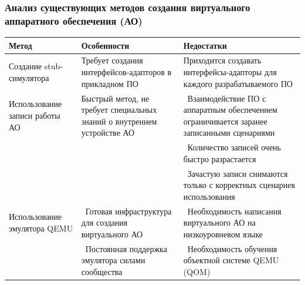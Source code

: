 \begin{frame}%
    \frametitle{Анализ существующих методов создания виртуального аппаратного обеспечения (АО)}
    \newcommand{\tabitem}{{\textbullet}~}
        {\fontsize{8pt}{9.5pt}\selectfont
            \begin{longtable}{| p{3cm} | p{3cm} | p{4cm} |}
                \hline
                Метод & Особенности & Недостатки \\
                \hline
                    Создание stub-симулятора &
                    Требует создания интерфейсов-адапторов в прикладном ПО &
                    Приходится создавать интерфейсы-адапторы для каждого разрабатываемого ПО \\
                \hline
                    Использование записи работы АО &
                    Быстрый метод, не требует специальных знаний о внутреннем устройстве АО &
                    \tabitem Взаимодействие ПО с аппаратным обеспечением ограничивается заранее записанными сценариями \\
                \makecell{} & \makecell{} & \tabitem Количество записей очень быстро разрастается \\
                \makecell{} & \makecell{} & \tabitem Зачастую записи снимаются только с корректных сценариев использования \\
                \hline
                Использование эмулятора QEMU &
                \tabitem Готовая инфраструктура для создания виртуального АО &
                \tabitem Необходимость написания виртуального АО на низкоуровневом языке \\
                \makecell{} &
                \tabitem Постоянная поддержка эмулятора силами сообщества &
                \tabitem Необходимость обучения объектной системе QEMU (QOM) \\
                \hline
            \end{longtable}
        }
\end{frame}


